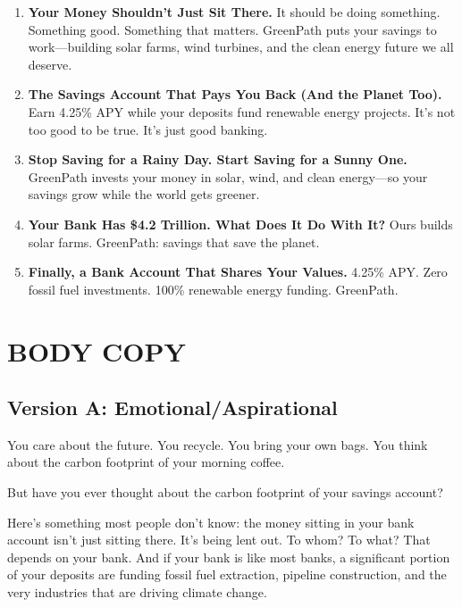 \documentclass[
    language=english,
    doctype=advertising-copy,
    institution=none,
]{../../omnilatex}
\begin{document}
\begin{enumerate}
    \item \textbf{Your Money Shouldn't Just Sit There.} It should be doing something. Something good. Something that matters. GreenPath puts your savings to work---building solar farms, wind turbines, and the clean energy future we all deserve.
    
    \item \textbf{The Savings Account That Pays You Back (And the Planet Too).} Earn 4.25\% APY while your deposits fund renewable energy projects. It's not too good to be true. It's just good banking.
    
    \item \textbf{Stop Saving for a Rainy Day. Start Saving for a Sunny One.} GreenPath invests your money in solar, wind, and clean energy---so your savings grow while the world gets greener.
    
    \item \textbf{Your Bank Has \$4.2 Trillion. What Does It Do With It?} Ours builds solar farms. GreenPath: savings that save the planet.
    
    \item \textbf{Finally, a Bank Account That Shares Your Values.} 4.25\% APY. Zero fossil fuel investments. 100\% renewable energy funding. GreenPath.
\end{enumerate}

\section*{BODY COPY}

\subsection*{Version A: Emotional/Aspirational}

You care about the future. You recycle. You bring your own bags. You think about the carbon footprint of your morning coffee.

But have you ever thought about the carbon footprint of your savings account?

Here's something most people don't know: the money sitting in your bank account isn't just sitting there. It's being lent out. To whom? To what? That depends on your bank. And if your bank is like most banks, a significant portion of your deposits are funding fossil fuel extraction, pipeline construction, and the very industries that are driving climate change.
\end{document}
